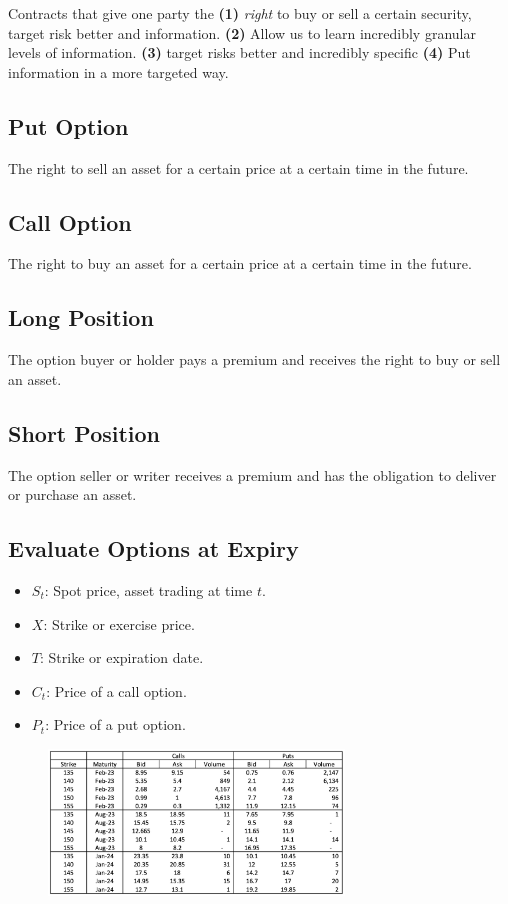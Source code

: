 Contracts that give one party the \textbf{(1)} \textit{right} to buy or sell a certain security, target risk better and information. \textbf{(2)} Allow us to learn incredibly granular levels of information. \textbf{(3)} target risks better and incredibly specific \textbf{(4)} Put information in a more targeted way. 

\begin{multicols}{2}
\subsection{Put Option}
The right to sell an asset for a certain price at a certain time in the future.
\subsection{Call Option}
The right to buy an asset for a certain price at a certain time in the future.
\subsection{Long Position}
The option buyer or holder pays a premium and receives the right to buy or sell an asset.
\subsection{Short Position}
The option seller or writer receives a premium and has the obligation to deliver or purchase an asset.
\subsection{Evaluate Options at Expiry}
\begin{itemize}
    \item $S_t$: Spot price, asset trading at time $t$.
    \item $X$: Strike or exercise price. 
    \item $T$: Strike or expiration date.
    \item $C_t$: Price of a call option.
    \item $P_t$: Price of a put option.
\end{itemize}

\end{multicols}

\begin{figure}[H]
    \centering 
    \includegraphics[width =0.7\textwidth]{Figure/option.png}
\end{figure}

